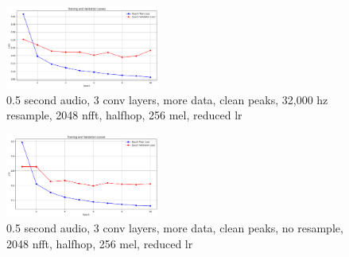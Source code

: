 \documentclass[twocolumn]{article}
\begin{document}
\begin{figure}
\centering
\includegraphics[width=0.45\textwidth]{figures/loss_plot_moredata_halfs_3conv_cleanpeaks_3200resample_2048nfft_halfhop_256nmel_drop_lr.png}
\caption{0.5 second audio, 3 conv layers, more data, clean peaks, 32,000 hz resample, 2048 nfft, halfhop, 256 mel, reduced lr}
\label{fig:halfs_3conv_moredata_cleanpeaks_3200resample_2048nfft_halfhop_256nmel_reduced_lr}
\end{figure}

\begin{figure}
\centering
\includegraphics[width=0.45\textwidth]{figures/loss_plot_moredata_halfs_3conv_cleanpeaks_noresample_2048nfft_halfhop_256nmel_drop_lr.png}
\caption{0.5 second audio, 3 conv layers, more data, clean peaks, no resample, 2048 nfft, halfhop, 256 mel, reduced lr}
\label{fig:loss_plot_moredata_halfs_3conv_cleanpeaks_noresample_2048nfft_halfhop_256nmel_drop_lr}
\end{figure}

\printbibliography
\end{document}
